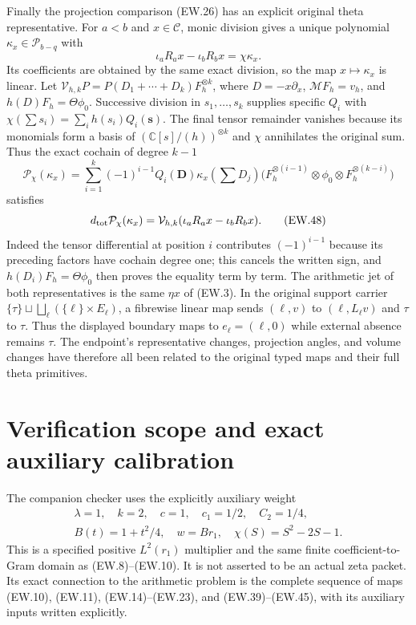 \documentclass[11pt]{article}
\newcommand{\C}{\mathbb C}
\begin{document}
Finally the projection comparison (EW.26) has an explicit original
theta representative. For $a<b$ and $x\in\mathcal C$, monic
division gives a unique polynomial $\kappa_x\in\mathcal P_{b-q}$
with
\[
 \iota_aR_ax-\iota_bR_bx=\chi\kappa_x.                       \tag{EW.46}
\]
Its coefficients are obtained by the same exact division, so the
map $x\mapsto\kappa_x$ is linear. Let
$\mathcal V_{h,k}P=P(D_1+\cdots+D_k)F_h^{\otimes k}$, where
$D=-x\partial_x$, $\mathcal MF_h=v_h$, and
$h(D)F_h=\Theta\phi_0$. Successive division in
$s_1,\ldots,s_k$ supplies specific $Q_i$ with
$\chi(\sum s_i)=\sum_i h(s_i)Q_i(\mathbf s)$.
The final tensor remainder vanishes because its monomials form a
basis of $(\C[s]/(h))^{\otimes k}$ and $\chi$ annihilates
the original sum. Thus the exact cochain of degree $k-1$
\[
 \mathcal P_\chi(\kappa_x)=
 \sum_{i=1}^k(-1)^{i-1}Q_i(\mathbf D)\kappa_x(\textstyle\sum D_j)
 \bigl(F_h^{\otimes(i-1)}\otimes\phi_0\otimes
                         F_h^{\otimes(k-i)}\bigr)            \tag{EW.47}
\]
satisfies
\[
 d_{\rm tot}\mathcal P_\chi(\kappa_x)
   =\mathcal V_{h,k}(\iota_aR_ax-\iota_bR_bx).                \tag{EW.48}
\]
Indeed the tensor differential at position $i$ contributes
$(-1)^{i-1}$ because its preceding factors have cochain degree
one; this cancels the written sign, and $h(D_i)F_h=\Theta\phi_0$
then proves the equality term by term. The arithmetic jet of both
representatives is the same $\eta x$ of (EW.3). In the original
support carrier $\{\tau\}\sqcup\bigsqcup_\ell(\{\ell\}\times E_\ell)$,
a fibrewise linear map sends $(\ell,v)$ to $(\ell,L_\ell v)$
and $\tau$ to $\tau$. Thus the displayed boundary maps to
$e_\ell=(\ell,0)$ while external absence remains $\tau$.
The endpoint's representative changes, projection angles, and volume
changes have therefore all been related to the original typed maps
and their full theta primitives.

\section{Verification scope and exact auxiliary calibration}

The companion checker uses the explicitly auxiliary weight
\[
 \begin{gathered}
 \lambda=1,\quad k=2,\quad c=1,\quad c_1=1/2,\quad C_2=1/4,\\
 B(t)=1+t^2/4,\quad w=B r_1,\quad\chi(S)=S^2-2S-1.
 \end{gathered}                                               \tag{EW.49}
\]
This is a specified positive $L^2(r_1)$ multiplier and the same
finite coefficient-to-Gram domain as (EW.8)--(EW.10). It is not
asserted to be an actual zeta packet. Its exact connection to the
arithmetic problem is the complete sequence of maps (EW.10),
(EW.11), (EW.14)--(EW.23), and (EW.39)--(EW.45), with its
auxiliary inputs written explicitly.
\end{document}
